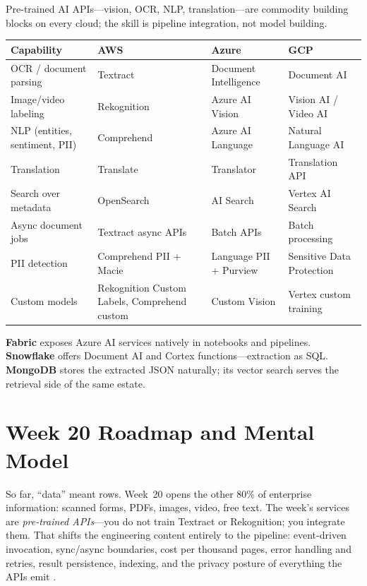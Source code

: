\begin{crosscloud}
Pre-trained AI APIs---vision, OCR, NLP, translation---are commodity building blocks on every cloud; the skill is pipeline integration, not model building.

\vspace{2mm}
{\footnotesize
\begin{tabular}{@{}p{2.8cm}p{3.0cm}p{3.0cm}p{3.0cm}@{}}
\toprule
\textbf{Capability} & \textbf{AWS} & \textbf{Azure} & \textbf{GCP} \\
\midrule
OCR / document parsing & Textract & Document Intelligence & Document AI \\
Image/video labeling & Rekognition & Azure AI Vision & Vision AI / Video AI \\
NLP (entities, sentiment, PII) & Comprehend & Azure AI Language & Natural Language AI \\
Translation & Translate & Translator & Translation API \\
Search over metadata & OpenSearch & AI Search & Vertex AI Search \\
Async document jobs & Textract async APIs & Batch APIs & Batch processing \\
\addlinespace
PII detection & Comprehend PII + Macie & Language PII + Purview & Sensitive Data Protection \\
Custom models & Rekognition Custom Labels, Comprehend custom & Custom Vision & Vertex custom training \\
\bottomrule
\end{tabular}}

\vspace{1mm}
\textbf{Fabric} exposes Azure AI services natively in notebooks and pipelines. \textbf{Snowflake} offers Document AI and Cortex functions---extraction as SQL. \textbf{MongoDB} stores the extracted JSON naturally; its vector search serves the retrieval side of the same estate.
\end{crosscloud}

\section{Week 20 Roadmap and Mental Model}
So far, ``data'' meant rows. Week~20 opens the other 80\% of enterprise information: scanned forms, PDFs, images, video, free text. The week's services are \emph{pre-trained APIs}---you do not train Textract or Rekognition; you integrate them. That shifts the engineering content entirely to the pipeline: event-driven invocation, sync/async boundaries, cost per thousand pages, error handling and retries, result persistence, indexing, and the privacy posture of everything the APIs emit \cite{awsTextractDocs,awsRekognitionDocs}.

